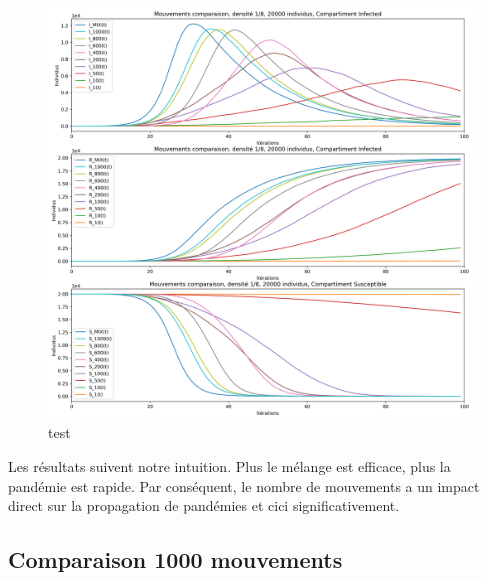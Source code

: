 \begin{figure}[h]
	\centering
	\captionsetup{justification=centering}
	\includegraphics[width=.7\textwidth]{Images/SIR_mouvements_variables.png}
	\caption{test}
\end{figure}

Les résultats suivent notre intuition. Plus le mélange est efficace, plus la pandémie est rapide. Par conséquent, le nombre de mouvements a un impact direct sur la propagation de pandémies et cici significativement. 

\subsection{Comparaison 1000 mouvements}

